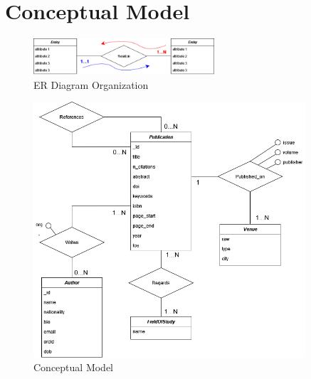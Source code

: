 \documentclass{Configuration_Files/PoliMi3i_thesis}
\begin{document}
\chapter{Conceptual Model}
\label{ch:conc_model}
\begin{figure}[H]
\centering
\includegraphics[width=0.6\textwidth]{legendaER.png}
\caption{ER Diagram Organization}
\label{fig:erleg}
\end{figure}
\begin{figure}[H]
\centering
\includegraphics[width=0.9\textwidth]{ERSpark.jpg}
\caption{Conceptual Model}
\label{fig:er}
\end{figure}
\newpage
\end{document}
